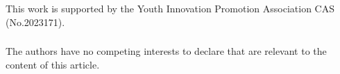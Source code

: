 \documentclass{llncs}
\begin{document}
\FloatBarrier
\begin{credits}
\subsubsection{\ackname}
This work is supported by the Youth Innovation Promotion Association CAS (No.2023171).
\subsubsection{\discintname}
The authors have no competing interests to declare that are relevant to the content of this article.
\end{credits}



\end{document}
